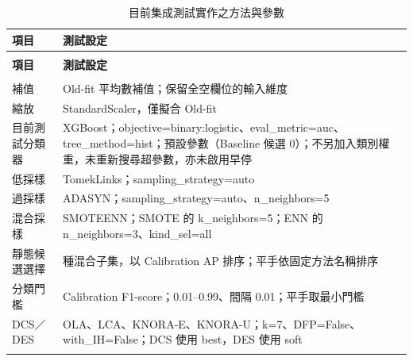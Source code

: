 \begingroup
\footnotesize
{}
\setlength{\tabcolsep}{4pt}
\renewcommand{\arraystretch}{1.25}
\setlength{\LTleft}{0pt plus 1fill}
\setlength{\LTright}{0pt plus 1fill}
\begin{longtable}{@{}>{\raggedright\arraybackslash}p{}>{\raggedright\arraybackslash}p{}@{}}
\caption{目前集成測試實作之方法與參數}\label{tab:method-parameters}\\
\toprule
\textbf{項目} & \textbf{測試設定} \\
\midrule
\endfirsthead
\multicolumn{2}{c}{表~\thetable（續）}\\
\toprule
\textbf{項目} & \textbf{測試設定} \\
\midrule
\endhead
\midrule
\multicolumn{2}{r}{續下頁}\\
\endfoot
\bottomrule
\endlastfoot
補值 & Old-fit 平均數補值；保留全空欄位的輸入維度 \\
\addlinespace[2pt]
縮放 & StandardScaler，僅擬合 Old-fit \\
\addlinespace[2pt]
目前測試分類器 & XGBoost；{\normalfont objective=\allowbreak{}binary:logistic}、{\normalfont eval\_\allowbreak{}metric=\allowbreak{}auc}、{\normalfont tree\_\allowbreak{}method=\allowbreak{}hist}；預設參數（Baseline 候選 0）；不另加入類別權重，未重新搜尋超參數，亦未啟用早停 \\
\addlinespace[2pt]
低採樣 & TomekLinks；{\normalfont sampling\_\allowbreak{}strategy=\allowbreak{}auto} \\
\addlinespace[2pt]
過採樣 & ADASYN；{\normalfont sampling\_\allowbreak{}strategy=\allowbreak{}auto}、{\normalfont n\_\allowbreak{}neighbors=\allowbreak{}5} \\
\addlinespace[2pt]
混合採樣 & SMOTEENN；SMOTE 的 {\normalfont k\_\allowbreak{}neighbors=\allowbreak{}5}；ENN 的 {\normalfont n\_\allowbreak{}neighbors=\allowbreak{}3}、{\normalfont kind\_\allowbreak{}sel=\allowbreak{}all} \\
\addlinespace[2pt]
靜態候選選擇 & 49 種混合子集，以 Calibration AP 排序；平手依固定方法名稱排序 \\
\addlinespace[2pt]
分類門檻 & Calibration F1-score；0.01–0.99、間隔 0.01；平手取最小門檻 \\
\addlinespace[2pt]
DCS／DES & OLA、LCA、KNORA-E、KNORA-U；{\normalfont k=\allowbreak{}7}、{\normalfont DFP=\allowbreak{}False}、{\normalfont with\_\allowbreak{}IH=\allowbreak{}False}；DCS 使用 {\normalfont best}，DES 使用 {\normalfont soft} \\*
\end{longtable}
\endgroup

